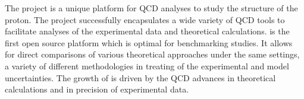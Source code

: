 
\label{sec:summary}
The \fitter project is a unique platform for QCD analyses to study the 
structure of the proton.
The project successfully encapsulates a wide variety
of QCD tools to facilitate analyses of the experimental data
and theoretical calculations. \fitter is the first open source platform which is optimal for benchmarking studies. It allows for direct comparisons of various theoretical approaches under the same settings, a variety of different methodologies in treating of the experimental and model uncertainties. The growth of \fitter is driven by the QCD advances in theoretical calculations and in precision of experimental data.


